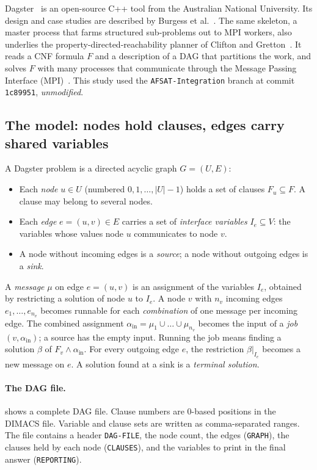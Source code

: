 \documentclass[11pt,a4paper]{article}
\begin{document}
Dagster~\cite{burgess2022dagster,burgess2023dagster,dagster} is an open-source C++ tool from the
Australian National University. Its design and case studies are described by Burgess et
al.~\cite{burgess2022dagster,burgess2023dagster}. The same skeleton, a master process that farms
structured sub-problems out to MPI workers, also underlies the property-directed-reachability
planner of Clifton and Gretton~\cite{clifton2023pdr}.
It reads a CNF formula $F$ and a description of a DAG that partitions the work, and solves
$F$ with many processes that communicate through the Message Passing Interface
(MPI)~\cite{mpi40}. This study used the \texttt{AFSAT-Integration} branch at commit
\texttt{1c89951}, \emph{unmodified}.

\subsection{The model: nodes hold clauses, edges carry shared variables}
A Dagster problem is a directed acyclic graph $G=(U,E)$:
\begin{itemize}
\item Each \emph{node} $u\in U$ (numbered $0,1,\dots,|U|-1$) holds a set of clauses
      $F_u\subseteq F$. A clause may belong to several nodes.
\item Each \emph{edge} $e=(u,v)\in E$ carries a set of \emph{interface variables}
      $I_e\subseteq V$: the variables whose values node $u$ communicates to node $v$.
\item A node without incoming edges is a \emph{source}; a node without outgoing edges is a
      \emph{sink}.
\end{itemize}
A \emph{message} $\mu$ on edge $e=(u,v)$ is an assignment of the variables $I_e$, obtained by
restricting a solution of node $u$ to $I_e$. A node $v$ with $n_v$ incoming edges
$e_1,\dots,e_{n_v}$ becomes runnable for each \emph{combination} of one message per incoming
edge. The combined assignment $\alpha_{\text{in}} = \mu_1\cup\dots\cup\mu_{n_v}$ becomes the
input of a \emph{job} $(v,\alpha_{\text{in}})$; a source has the empty input. Running the
job means finding a solution $\beta$ of $F_v\land\alpha_{\text{in}}$. For every outgoing
edge $e$, the restriction $\beta|_{I_e}$ becomes a new message on $e$. A solution found at
a sink is a \emph{terminal solution}.

\paragraph{The DAG file.}
 shows a complete DAG file. Clause numbers are 0-based positions in the
DIMACS file. Variable and clause sets are written as comma-separated ranges. The file
contains a header \texttt{DAG-FILE}, the node count, the edges (\texttt{GRAPH}), the
clauses held by each node (\texttt{CLAUSES}), and the variables to print in the final
answer (\texttt{REPORTING}).
\end{document}
